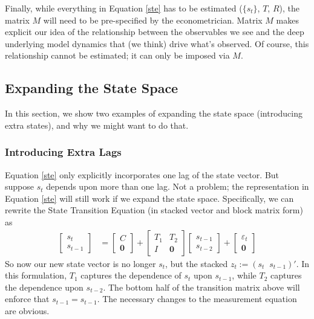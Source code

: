 \documentclass[a4paper,12pt]{article}
\begin{document}
Finally, while everything in Equation \ref{ste} has to be estimated ($\{s_t\}$, $T$, $R$), the matrix $M$ will need to be pre-specified by the econometrician. Matrix $M$ makes explicit our idea of the relationship between the observables we see and the deep underlying model dynamics that (we think) drive what's observed. Of course, this relationship cannot be estimated; it can only be imposed via $M$.

\subsection{Expanding the State Space}

In this section, we show two examples of expanding the state space (introducing extra states), and why we might want to do that. 

\subsubsection{Introducing Extra Lags}

Equation \ref{ste} only explicitly incorporates one lag of the state vector. But suppose $s_t$ depends upon more than one lag. Not a problem; the representation in Equation \ref{ste} will still work if we expand the state space. Specifically, we can rewrite the State Transition Equation (in stacked vector and block matrix form) as 
\begin{align}
  \begin{bmatrix} s_{t} \\ s_{t-1}
  \end{bmatrix}
     &= 
  \begin{bmatrix} C \\ \mathbf{0} 
  \end{bmatrix}
  +\begin{bmatrix} T_1 & T_2 \\ I & \mathbf{0}
  \end{bmatrix}
  \begin{bmatrix} s_{t-1} \\ s_{t-2}
  \end{bmatrix}
  + \begin{bmatrix} 
      \varepsilon_{t}  \\ \mathbf{0}
    \end{bmatrix}
  \label{augmented.lags} 
\end{align}
So now our new state vector is no longer $s_t$, but the stacked $z_t:=(s_t \;\; s_{t-1})'$. In this formulation, $T_1$ captures the dependence of $s_t$ upon $s_{t-1}$, while $T_2$ captures the dependence upon $s_{t-2}$. The bottom half of the transition matrix above will enforce that $s_{t-1}=s_{t-1}$. The necessary changes to the measurement equation are obvious.
\end{document}
